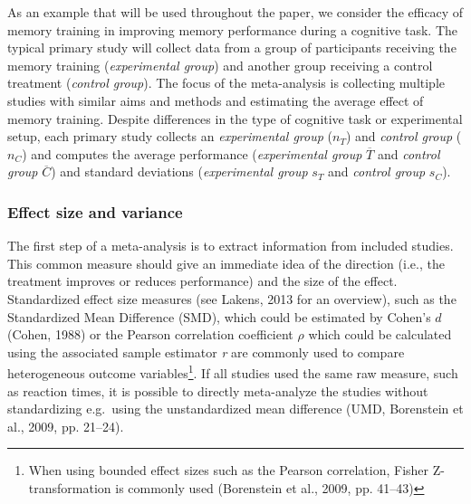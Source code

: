 \documentclass[
  man,floatsintext]{apa6}
\begin{document}
As an example that will be used throughout the paper, we consider the efficacy of memory training in improving memory performance during a cognitive task. The typical primary study will collect data from a group of participants receiving the memory training (\emph{experimental group}) and another group receiving a control treatment (\emph{control group}). The focus of the meta-analysis is collecting multiple studies with similar aims and methods and estimating the average effect of memory training. Despite differences in the type of cognitive task or experimental setup, each primary study collects an \emph{experimental group} (\(n_{T}\)) and \emph{control group} (\(n_{C}\)) and computes the average performance (\emph{experimental group} \(\overline T\) and \emph{control group} \(\overline C\)) and standard deviations (\emph{experimental group} \(s_{T}\) and \emph{control group}
\(s_{C}\)).

\subsubsection{Effect size and variance}\label{effect-size-and-variance}

The first step of a meta-analysis is to extract information from included studies. This common measure should give an immediate idea of the direction (i.e., the treatment improves or reduces performance) and the size of the effect. Standardized effect size measures (see Lakens, 2013 for an overview), such as the Standardized Mean Difference (SMD), which could be estimated by Cohen's \(d\) (Cohen, 1988) or the Pearson correlation coefficient \(\rho\) which could be calculated using the associated sample estimator \emph{r} are commonly used to compare heterogeneous outcome variables\footnote{ When using bounded effect sizes such as the Pearson correlation, Fisher Z-transformation is commonly used (Borenstein et al., 2009, pp. 41--43)}. If all studies used the same raw measure, such as reaction times, it is possible to directly meta-analyze the studies without standardizing e.g.~using the unstandardized mean difference (UMD, Borenstein et al., 2009, pp. 21--24).
\end{document}
